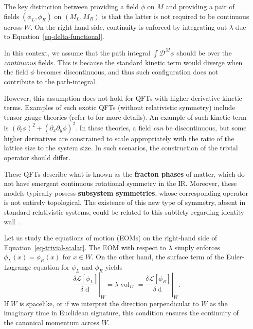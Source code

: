 \documentclass[
  letterpaper,
  DIV=11,
  numbers=noendperiod]{scrreport}
\DeclareMathOperator{\vol}{vol}
\begin{document}
The key distinction between providing a field \(\phi\) on \(M\) and
providing a pair of fields \((\phi_L,\phi_R)\) on \((M_L,M_R)\) is that
the latter is not required to be continuous across \(W\). On the
right-hand side, continuity is enforced by integrating out \(\lambda\)
due to Equation~\ref{eq-delta-functional}.

\begin{tcolorbox}[enhanced jigsaw, left=2mm, toprule=.15mm, bottomtitle=1mm, titlerule=0mm, leftrule=.75mm, colframe=quarto-callout-tip-color-frame, opacitybacktitle=0.6, title=\textcolor{quarto-callout-tip-color}{\faLightbulb}\hspace{0.5em}{Continuity of Fields in ``Exotic'' QFTs and Subsystem Symmetry}, bottomrule=.15mm, breakable, arc=.35mm, toptitle=1mm, colbacktitle=quarto-callout-tip-color!10!white, rightrule=.15mm, opacityback=0, coltitle=black, colback=white]

In this context, we assume that the path integral
\(\int\mathcal{D}^M\phi\) should be over the \emph{continuous} fields.
This is because the standard kinetic term would diverge when the field
\(\phi\) becomes discontinuous, and thus such configuration does not
contribute to the path-integral.

However, this assumption does not hold for QFTs with higher-derivative
kinetic terms. Examples of such exotic QFTs (without relativistic
symmetry) include tensor gauge theories (refer to
\autocite{Pretko:2020cko,Seiberg:2020bhn} for more details). An example
of such kinetic term is
\((\partial_t\phi)^2 + (\partial_x\partial_y \phi)^2\). In these
theories, a field \emph{can} be discontinuous, but some higher
derivatives are constrained to scale appropriately with the ratio of the
lattice size to the system size. In such scenarios, the construction of
the trivial operator should differ.

These QFTs describe what is known as the \textbf{fracton phases} of
matter, which do not have emergent continuous rotational symmetry in the
IR. Moreover, these models typically possess \textbf{subsystem
symmetries}, whose corresponding operator is not entirely topological.
The existence of this new type of symmetry, absent in standard
relativistic systems, could be related to this subtlety regarding
identity wall .

\end{tcolorbox}

Let us study the equations of motion (EOMs) on the right-hand side of
Equation~\ref{eq-trivial-scalar}. The EOM with respect to \(\lambda\)
simply enforces \(\phi_L(x) = \phi_R(x)\) for \(x\in W\). On the other
hand, the surface term of the Euler-Lagrange equation for \(\phi_L\) and
\(\phi_R\) yields \[
    \left.\frac{\delta \mathcal{L}[\phi_L]}{\delta \mathop{d\phi_L}}\right|_W = \lambda \vol_W = \left. \frac{\delta \mathcal{L}[\phi_R]}{\delta \mathop{d \phi_R}}\right|_W.
\] If \(W\) is spacelike, or if we interpret the direction perpendicular
to \(W\) as the imaginary time in Euclidean signature, this condition
ensures the continuity of the canonical momentum across \(W\).
\end{document}

